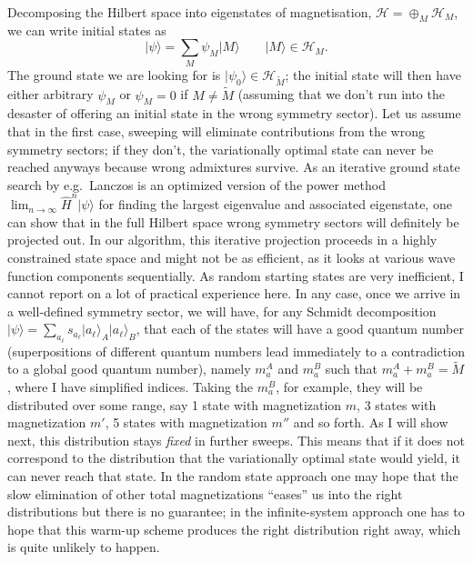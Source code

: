 \documentclass[a4paper,10pt,oneside,onecolumn,1p,times]{elsarticle}
\newcommand{\ket}[1]{\mbox{$| #1  \rangle$}}
\begin{document}
Decomposing the Hilbert space into eigenstates of magnetisation, ${\mathcal H} = \oplus_M {\mathcal H}_M$, we can write initial states as 
\begin{equation}
\ket{\psi} = \sum_M \psi_M \ket{M} \quad\quad \ket{M} \in {\mathcal H}_M .
\end{equation}
The ground state we are looking for is $\ket{\psi_0} \in {\mathcal H}_{\tilde{M}}$; the initial state will then have either arbitrary $\psi_M$ or $\psi_M = 0$ if $M \neq \tilde{M}$ (assuming that we don't run into the desaster of offering an initial state in the wrong symmetry sector). Let us assume that in the first case, sweeping will eliminate contributions from the wrong symmetry sectors; if they don't, the variationally optimal state can never be reached anyways because wrong admixtures survive. As an iterative ground state search by e.g.\  Lanczos is an optimized version of the power method $\lim_{n\rightarrow\infty} \hat{H}^n \ket{\psi}$ for finding the largest eigenvalue and associated eigenstate, one can show that in the full Hilbert space wrong symmetry sectors will definitely be projected out.  In our algorithm, this iterative projection proceeds in a highly constrained state space and might not be as efficient, as it looks at various wave function components sequentially. As random starting states are very inefficient, I cannot report on a lot of practical experience here.
In any case, once we arrive in a well-defined symmetry sector, we will have, for any Schmidt decomposition $\ket{\psi} = \sum_{a_\ell} s_{a_\ell} \ket{a_\ell}_A \ket{a_\ell}_B$, that each of the states will have a good quantum number (superpositions of different quantum numbers lead immediately to a contradiction to a global good quantum number), namely $m_a^A$ and $m_a^B$ such that $m_a^A + m_a^B = \tilde{M}$, where I have simplified indices. Taking the $m_a^B$, for example, they will be distributed over some range, say 1 state with magnetization $m$, 3 states with magnetization $m'$, 5 states with magnetization $m''$ and so forth. As I will show next, this distribution stays {\em fixed} in further sweeps. This means that if it does not correspond to the distribution that the variationally optimal state would yield, it can never reach that state. In the random state approach one may hope that the slow elimination of other total magnetizations ``eases'' us into the right distributions but there is no guarantee; in the infinite-system approach one has to hope that this warm-up scheme produces the right distribution right away, which is quite unlikely to happen. 
\end{document}
